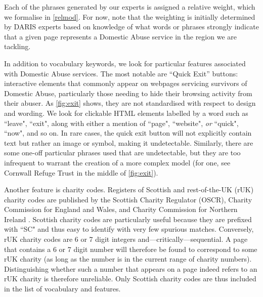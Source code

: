 \documentclass[conference]{IEEEtran}
\begin{document}
Each of the phrases generated by our experts is assigned a relative weight, which we formalise in \cref{relmod}.
For now, note that the weighting is initially determined by DARIS experts based on knowledge of what words or phrases strongly indicate that a given page represents a Domestic Abuse service in the region we are tackling.

In addition to vocabulary keywords, we look for particular features associated with Domestic Abuse services. 
The most notable are ``Quick Exit'' buttons: interactive elements that commonly appear on webpages servicing survivors of Domestic Abuse, particularly those needing to hide their browsing activity from their abuser. 
As \cref{fig:exit} shows, they are not standardised with respect to design and wording.
We look for clickable HTML elements labelled by a word such as ``leave", ``exit", along with either a mention of ``page", ``website", \textit{or} ``quick", ``now", and so on. 
In rare cases, the quick exit button will not explicitly contain text but rather an image or symbol, making it undetectable. Similarly, there are some one-off particular phrases used that are undetectable, but they are too infrequent to warrant the creation of a more complex model (for one, see Cornwall Refuge Trust in the middle of \cref{fig:exit}).

Another feature is charity codes.
Registers of Scottish and rest-of-the-UK (rUK) charity codes are published by the Scottish Charity Regulator (OSCR), Charity Commission for England and Wales, and Charity Commission for Northern Ireland \cite{scotchar, rukchar, nichar}.
Scottish charity codes are particularly useful because they are prefixed with ``SC" and thus easy to identify with very few spurious matches. 
Conversely, rUK charity codes are 6 or 7 digit integers and---critically---sequential. 
A page that contains a 6 or 7 digit number will therefore be found to correspond to some rUK charity (as long as the number is in the current range of charity numbers).
Distinguishing whether such a number that appears on a page indeed refers to an rUK charity is therefore unreliable.
Only Scottish charity codes are thus included in the list of vocabulary and features.
\end{document}

